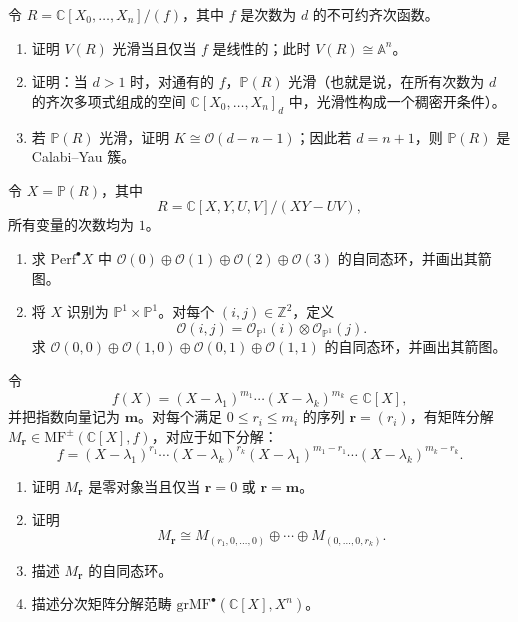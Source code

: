 \begin{exercise}\label{exer:projective-hypersurface-smoothness}
令 $R=\mathbb C[X_0,\ldots,X_n]/(f)$，其中 $f$ 是次数为 $d$ 的不可约齐次函数。
\begin{enumerate}[label=(\roman*)]
  \item 证明 $V(R)$ 光滑当且仅当 $f$ 是线性的；此时 $V(R)\cong\mathbb A^n$。
  \item 证明：当 $d>1$ 时，对通有的 $f$，$\mathbb P(R)$ 光滑（也就是说，在所有次数为 $d$ 的齐次多项式组成的空间 $\mathbb C[X_0,\ldots,X_n]_d$ 中，光滑性构成一个稠密开条件）。
  \item 若 $\mathbb P(R)$ 光滑，证明 $K\cong\mathcal O(d-n-1)$；因此若 $d=n+1$，则 $\mathbb P(R)$ 是 Calabi--Yau 簇。
\end{enumerate}
\end{exercise}

\begin{exercise}\label{exer:quadric-surface-tilting}
令 $X=\mathbb P(R)$，其中
\[
  R=\mathbb C[X,Y,U,V]/(XY-UV),
\]
所有变量的次数均为 $1$。
\begin{enumerate}[label=(\roman*)]
  \item 求 $\mathrm{Perf}^{\bullet}X$ 中 $\mathcal O(0)\oplus\mathcal O(1)\oplus\mathcal O(2)\oplus\mathcal O(3)$ 的自同态环，并画出其箭图。
  \item 将 $X$ 识别为 $\mathbb P^1\times\mathbb P^1$。对每个 $(i,j)\in\mathbb Z^2$，定义
  \[
    \mathcal O(i,j)=\mathcal O_{\mathbb P^1}(i)\otimes\mathcal O_{\mathbb P^1}(j).
  \]
  求 $\mathcal O(0,0)\oplus\mathcal O(1,0)\oplus\mathcal O(0,1)\oplus\mathcal O(1,1)$ 的自同态环，并画出其箭图。
\end{enumerate}
\end{exercise}

\begin{exercise}\label{exer:matrix-factorizations-univariate}
令
\[
  f(X)=(X-\lambda_1)^{m_1}\cdots(X-\lambda_k)^{m_k}\in\mathbb C[X],
\]
并把指数向量记为 $\mathbf m$。对每个满足 $0\leq r_i\leq m_i$ 的序列 $\mathbf r=(r_i)$，有矩阵分解 $M_{\mathbf r}\in\mathrm{MF}^{\pm}(\mathbb C[X],f)$，对应于如下分解：
\[
  f=(X-\lambda_1)^{r_1}\cdots(X-\lambda_k)^{r_k}
  (X-\lambda_1)^{m_1-r_1}\cdots(X-\lambda_k)^{m_k-r_k}.
\]
\begin{enumerate}[label=(\roman*)]
  \item 证明 $M_{\mathbf r}$ 是零对象当且仅当 $\mathbf r=0$ 或 $\mathbf r=\mathbf m$。
  \item 证明
  \[
    M_{\mathbf r}\cong M_{(r_1,0,\ldots,0)}\oplus\cdots\oplus M_{(0,\ldots,0,r_k)}.
  \]
  \item 描述 $M_{\mathbf r}$ 的自同态环。
  \item 描述分次矩阵分解范畴 $\mathrm{grMF}^{\bullet}(\mathbb C[X],X^n)$。
\end{enumerate}
\end{exercise}

